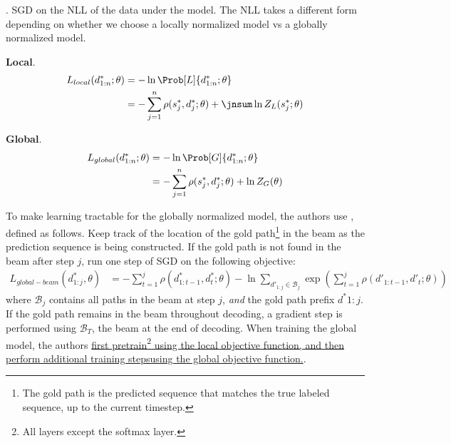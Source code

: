 \documentclass[11pt]{article}
\begin{document}
\myspace
\p {}. SGD on the NLL of the data under the model. The NLL takes a different form depending on whether we choose a locally normalized model vs a globally normalized model. 
\begin{compactitem}
	\item \textbf{Local}. 
	\begin{align}
	L_{local}(d_{1:n}^*; \theta )
	&= - \ln \Prob[L]{d_{1:n}^*; \theta} \\
	&=  -  \sum_{j = 1}^{n} \rho  ( s_j^*, d_j^* ; \theta  ) + \jnsum \ln Z_L (s_j^*; \theta) 
	\end{align}
	
	\item \textbf{Global}. 
	\begin{align}
	L_{global}(d_{1:n}^* ; \theta) 
	&=  - \ln \Prob[G]{d_{1:n}^*; \theta} \\
	&= -  \sum_{j = 1}^{n} \rho  ( s_j^*, d_j^* ; \theta  )  + \ln Z_G ( \theta) 
	\end{align}
\end{compactitem}
To make learning tractable for the globally normalized model, the authors use , defined as follows. Keep track of the location of the gold path\footnote{The gold path is the predicted sequence that matches the true labeled sequence, up to the current timestep.} in the beam as the prediction sequence is being constructed. If the gold path is not found in the beam after step $j$, run one step of SGD on the following objective:
\begin{align}
L_{global-beam}(d^*_{1:j}, \theta) 
&= -\sum_{t=1}^{j} \rho(d^*_{1:t-1}, d^*_t ; \theta) 
- \ln \sum_{d'_{1:j} \in \mathcal{B}_j} \exp\left( 
\sum_{t = 1}^j \rho(d'_{1:t-1}, d'_t; \theta)
\right)
\end{align}
where $\mathcal{B}_j$ contains all paths in the beam at step $j$, \textit{and} the gold path prefix $d^*{1:j}$. If the gold path remains in the beam throughout decoding, a gradient step is performed using $\mathcal{B}_T$, the beam at the end of decoding. When training the global model, the authors \underline{first pretrain\footnote{All layers except the softmax layer.} using the local objective function, and then perform additional training steps}\newline\underline{using the global objective function.}.
\end{document}
